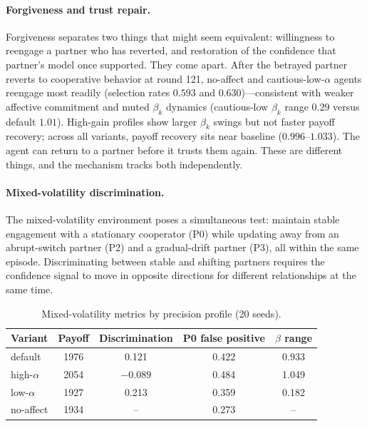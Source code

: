 \paragraph{Forgiveness and trust repair.}
Forgiveness separates two things that might seem equivalent: willingness to reengage a partner who has reverted, and restoration of the confidence that partner's model once supported. They come apart. After the betrayed partner reverts to cooperative behavior at round 121, no-affect and cautious-low-$\alpha$ agents reengage most readily (selection rates $0.593$ and $0.630$)---consistent with weaker affective commitment and muted $\beta_k$ dynamics (cautious-low $\beta_k$ range $0.29$ versus default $1.01$). High-gain profiles show larger $\beta_k$ swings but not faster payoff recovery; across all variants, payoff recovery sits near baseline ($0.996$--$1.033$). The agent can return to a partner before it trusts them again. These are different things, and the mechanism tracks both independently.

\FloatBarrier
\paragraph{Mixed-volatility discrimination.}
\label{sec:phenotypes_mixed}
The mixed-volatility environment poses a simultaneous test: maintain stable engagement with a stationary cooperator (P0) while updating away from an abrupt-switch partner (P2) and a gradual-drift partner (P3), all within the same episode. Discriminating between stable and shifting partners requires the confidence signal to move in opposite directions for different relationships at the same time.

\begin{table}[H]
\centering
\caption{Mixed-volatility metrics by precision profile (20 seeds).}
\label{tab:mixed_volatility}
\begin{tabular}{lcccc}
\toprule
Variant & Payoff & Discrimination & P0 false positive & $\beta$ range \\
\midrule
default & 1976 & 0.121 & 0.422 & 0.933 \\
high-$\alpha$ & 2054 & $-0.089$ & 0.484 & 1.049 \\
low-$\alpha$ & 1927 & 0.213 & 0.359 & 0.182 \\
no-affect & 1934 & -- & 0.273 & -- \\
\bottomrule
\end{tabular}
\end{table}

